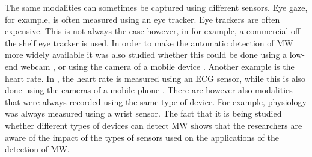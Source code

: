 The same modalities can sometimes be captured using different sensors. Eye gaze, for example, is often measured using an eye tracker. Eye trackers are often expensive. This is not always the case however, in \cite{Hutt2017OutClassroom} for example, a commercial off the shelf eye tracker is used. In order to make the automatic detection of MW more widely available it was also studied whether this could be done using a low-end webcam \cite{Stewart2017FaceComprehension}\cite{Stewart2016WheresViewing}\cite{Zhao2017ScalableApproach}, or using the camera of a mobile device \cite{ISI:000443429900018}. Another example is the heart rate. In \cite{Gontier2016HowEnvironment}, the heart rate is measured using an ECG sensor, while this is also done using the cameras of a mobile phone \cite{Pham2015Attentivelearner:Tracking}. There are however also modalities that were always recorded using the same type of device. For example, physiology was always measured using a wrist sensor. The fact that it is being studied whether different types of devices can detect MW shows that the researchers are aware of the impact of the types of sensors used on the applications of the detection of MW.